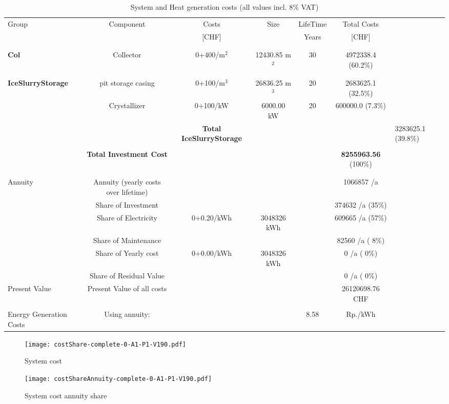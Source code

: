 \documentclass[english]{SPFShortReport}
\begin{document}
\begin{table}[!ht]
\centering
\caption{System and Heat generation costs (all values incl. 8$\%$ VAT) }
\begin{adjustbox}{max width =\textwidth}
\begin{tabular}{l | c c c c c } 
\hline
\hline
Group &Component &Costs &Size &LifeTime &Total Costs \\ 
 & &[CHF] & &Years &[CHF]\\ 
\hline
\\
\hline \\
\textbf{Col} & Collector & 0+400/m$^2$ & 12430.85 m$^2$ & 30 & 4972338.4 (60.2\%) \\
\hline \\
\hline \\
\textbf{IceSlurryStorage} & pit storage casing & 0+100/m$^3$ & 26836.25 m$^3$ & 20 & 2683625.1 (32.5\%) \\
 & Crystallizer & 0+100/kW & 6000.00 kW & 20 & 600000.0 (7.3\%) \\
&
 & \textbf{Total IceSlurryStorage} & & & & 3283625.1 (39.8\%) \\
\hline \\
 & \textbf{Total Investment Cost} & & & & \textbf{8255963.56} (100\%) \\ 
\hline \\ 
\hline \\ 
Annuity & Annuity (yearly costs over lifetime)  &&& & 1066857 /a  \\
 & Share of Investment & &&& 374632 /a (35\%) \\
 & Share of Electricity & 0+0.20/kWh & 3048326 kWh &  & 609665 /a (57\%)\\
 & Share of Maintenance & &&& 82560 /a ( 8\%)\\ 
 & Share of Yearly cost & 0+0.00/kWh & 3048326 kWh & &  0 /a ( 0\%)\\
 & Share of Residual Value &&& &  0 /a ( 0\%)\\
Present Value  & Present Value of all costs  & &&& 26120698.76 CHF \\
\hline \\ 
 Energy Generation Costs & Using annuity: &&& 8.58 & Rp./kWh \\
\hline
\hline
\end{tabular}
\end{adjustbox}
\label{CostsTable}
\end{table}
\begin{figure}[!htbp]
\begin{center}
\texttt{[image: costShare-complete-0-A1-P1-V190.pdf]}
\caption{System cost}
\label{systemCost}
\end{center}
\end{figure}
\begin{figure}[!htbp]
\begin{center}
\texttt{[image: costShareAnnuity-complete-0-A1-P1-V190.pdf]}
\caption{System cost annuity share}
\label{systemCostannuity}
\end{center}
\end{figure}
\end{document}
